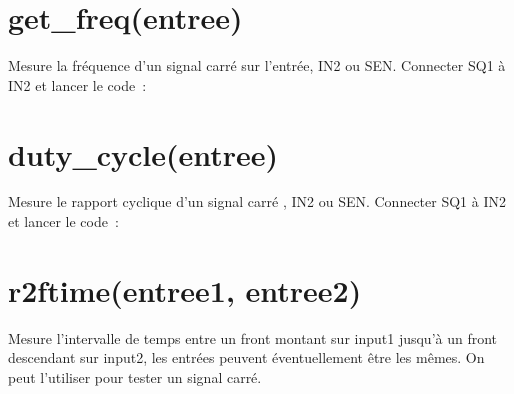 \documentclass[a4paper,12pt,french]{sphinxmanual}
\begin{document}
\begin{sphinxVerbatim}[commandchars=\\\{\}]
            
\end{sphinxVerbatim}


\section{get\_freq(entree)}
\label{\detokenize{7.1:get-freq-entree}}
Mesure la fréquence d’un signal carré sur l’entrée, IN2 ou SEN. Connecter
SQ1 à IN2 et lancer le code :

\begin{sphinxVerbatim}[commandchars=\\\{\}]
 
\end{sphinxVerbatim}


\section{duty\_cycle(entree)}
\label{\detokenize{7.1:duty-cycle-entree}}
Mesure le rapport cyclique d’un signal carré , IN2 ou SEN. Connecter
SQ1 à IN2 et lancer le code :

\begin{sphinxVerbatim}[commandchars=\\\{\}]
 
 
\end{sphinxVerbatim}


\section{r2ftime(entree1, entree2)}
\label{\detokenize{7.1:r2ftime-entree1-entree2}}
Mesure l’intervalle de temps entre un front montant sur input1 jusqu’à
un front descendant sur input2, les entrées peuvent éventuellement
être les mêmes. On peut l’utiliser pour tester un signal carré.
\end{document}
